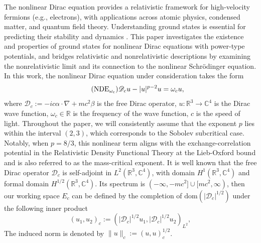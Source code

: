 \documentclass{amsart}
\theoremstyle{plain}
\theoremstyle{definition}
\theoremstyle{remark}
\numberwithin{equation}{section} \numberwithin{figure}{section}
\begin{document}
The nonlinear Dirac equation provides a relativistic framework for high-velocity fermions (e.g., electrons), with applications across atomic physics, condensed matter, and quantum field theory. Understanding ground states is essential for predicting their stability and dynamics \cite{ED11}. This paper investigates the existence and properties of ground states for nonlinear Dirac equations with power-type potentials, and bridges relativistic and nonrelativistic descriptions by examining the nonrelativistic limit and its connection to the nonlinear Schr\"odinger equation. In this work, the nonlinear Dirac equation under consideration takes the form
\begin{align}\label{Dirac}\tag{$\mathrm{NDE}_{\mathrm{\omega_c}}$}
\mathscr{D}_c u-|u|^{p-2}u=\omega_c  u,
\end{align}
where $\mathscr{D}_c:=-ic\alpha\cdot \nabla +mc^2\beta$ is the free Dirac operator, 
$u:\mathbb{R}^3\rightarrow \mathbb{C}^4$ is the Dirac wave function, $\omega_c\in \mathbb{R}$ is the frequency of the wave function, $c$ is the speed of light. Throughout the paper, we will consistently assume that the exponent $p$ lies within the interval $(2,3)$, which corresponds to the Sobolev subcritical case. Notably, when $p = 8/3$, this nonlinear term aligns with the exchange-correlation potential in the Relativistic Density Functional Theory at the Lieb-Oxford bound \cite{LLS22, LiebOxford} and is also referred to as the mass-critical exponent.
It is well known that the free Dirac operator $\mathscr{D}_c$ is self-adjoint in $L^2(\mathbb{R}^3,\mathbb{C}^4)$, with domain $H^1(\mathbb{R}^3,\mathbb{C}^4)$ and formal domain $H^{1/2}(\mathbb{R}^3,\mathbb{C}^4)$. Its spectrum is $(-\infty, -mc^2]\cup [mc^2,\infty)$, then  our working space $E_c$ can be defined by the completion of $\text{dom}(|\mathscr{D}_c|^{1/2})$ under the following inner product
$$
(u_1,u_2)_c:= \left(|\mathscr{D}_c|^{1/2}u_1, |\mathscr{D}_c|^{1/2}u_2\right)_{L^2},
$$
The induced norm is denoted by $\| u\|_c:=(u,u)_c^{1/2}$. 
\end{document}
